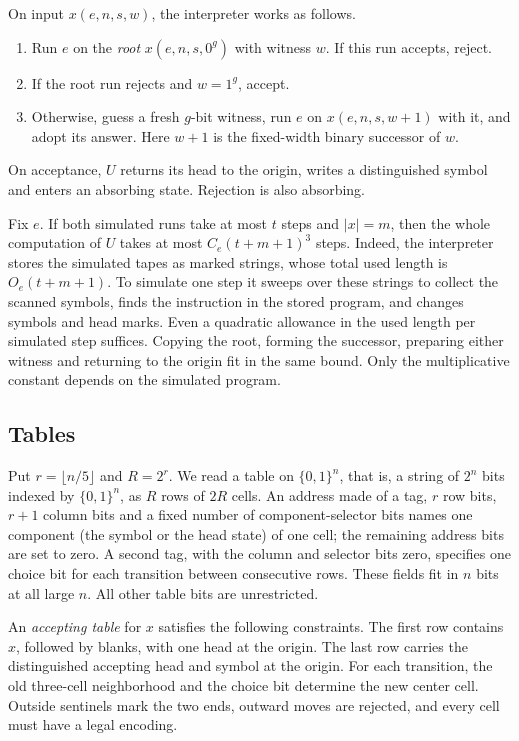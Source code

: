 \documentclass[12pt,letterpaper]{article}
\newcommand{\bits}{\{0,1\}}
\begin{document}
On input \(x(e,n,s,w)\), the interpreter works as follows.
\begin{enumerate}
\item Run \(e\) on the \emph{root} \(x(e,n,s,0^g)\) with witness \(w\). If
this run accepts, reject.
\item If the root run rejects and \(w=1^g\), accept.
\item Otherwise, guess a fresh \(g\)-bit witness, run \(e\) on
\(x(e,n,s,w+1)\) with it, and adopt its answer. Here \(w+1\) is the
fixed-width binary successor of \(w\).
\end{enumerate}
On acceptance, \(U\) returns its head to the origin, writes a distinguished
symbol and enters an absorbing state. Rejection is also absorbing.

Fix \(e\). If both simulated runs take at most \(t\) steps and \(|x|=m\),
then the whole computation of \(U\) takes at most \(C_e(t+m+1)^3\) steps.
Indeed, the interpreter stores the simulated tapes as marked strings, whose
total used length is \(O_e(t+m+1)\). To simulate one step it sweeps over
these strings to collect the scanned symbols, finds the instruction in the
stored program, and changes symbols and head marks. Even a quadratic
allowance in the used length per simulated step suffices. Copying the root,
forming the successor, preparing either witness and returning to the origin
fit in the same bound. Only the multiplicative constant depends on the
simulated program.

\subsection{Tables}
Put \(r=\lfloor n/5\rfloor\) and \(R=2^r\). We read a table on \(\bits^n\),
that is, a string of \(2^n\) bits indexed by \(\bits^n\), as \(R\) rows of
\(2R\) cells. An address made of a tag, \(r\) row bits, \(r+1\) column bits
and a fixed number of component-selector bits names one component (the
symbol or the head state) of one cell; the remaining address bits are set to
zero. A second tag, with the column and selector bits zero, specifies one
choice bit for each transition between consecutive rows. These fields fit in
\(n\) bits at all large \(n\). All other table bits are unrestricted.

An \emph{accepting table} for \(x\) satisfies the following constraints. The
first row contains \(x\), followed by blanks, with one head at the origin.
The last row carries the distinguished accepting head and symbol at the
origin. For each transition, the old three-cell neighborhood and the choice
bit determine the new center cell. Outside sentinels mark the two ends,
outward moves are rejected, and every cell must have a legal encoding.
\end{document}
